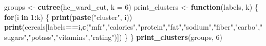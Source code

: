 \documentclass[
]{article}
\newenvironment{Shaded}{\begin{snugshade}}{\end{snugshade}}
\newcommand{\ControlFlowTok}[1]{\textcolor[rgb]{0.13,0.29,0.53}{\textbf{#1}}}
\newcommand{\DataTypeTok}[1]{\textcolor[rgb]{0.13,0.29,0.53}{#1}}
\newcommand{\DecValTok}[1]{\textcolor[rgb]{0.00,0.00,0.81}{#1}}
\newcommand{\KeywordTok}[1]{\textcolor[rgb]{0.13,0.29,0.53}{\textbf{#1}}}
\newcommand{\NormalTok}[1]{#1}
\newcommand{\OperatorTok}[1]{\textcolor[rgb]{0.81,0.36,0.00}{\textbf{#1}}}
\newcommand{\StringTok}[1]{\textcolor[rgb]{0.31,0.60,0.02}{#1}}
\begin{document}
\begin{Shaded}
\begin{Highlighting}[]
\NormalTok{groups <-}\StringTok{ }\KeywordTok{cutree}\NormalTok{(hc_ward_cut, }\DataTypeTok{k =} \DecValTok{6}\NormalTok{)}
\NormalTok{print_clusters <-}\StringTok{ }\ControlFlowTok{function}\NormalTok{(labels, k) \{}
\ControlFlowTok{for}\NormalTok{(i }\ControlFlowTok{in} \DecValTok{1}\OperatorTok{:}\NormalTok{k) \{}
\KeywordTok{print}\NormalTok{(}\KeywordTok{paste}\NormalTok{(}\StringTok{"cluster"}\NormalTok{, i))}
\KeywordTok{print}\NormalTok{(cereals[labels}\OperatorTok{==}\NormalTok{i,}\KeywordTok{c}\NormalTok{(}\StringTok{"mfr"}\NormalTok{,}\StringTok{"calories"}\NormalTok{,}\StringTok{"protein"}\NormalTok{,}\StringTok{"fat"}\NormalTok{,}\StringTok{"sodium"}\NormalTok{,}\StringTok{"fiber"}\NormalTok{,}\StringTok{"carbo"}\NormalTok{,}\StringTok{"sugars"}\NormalTok{,}\StringTok{"potass"}\NormalTok{,}\StringTok{"vitamins"}\NormalTok{,}\StringTok{"rating"}\NormalTok{)])}
\NormalTok{\}}
\NormalTok{\}}
\KeywordTok{print_clusters}\NormalTok{(groups, }\DecValTok{6}\NormalTok{)}
\end{Highlighting}
\end{Shaded}
\end{document}
